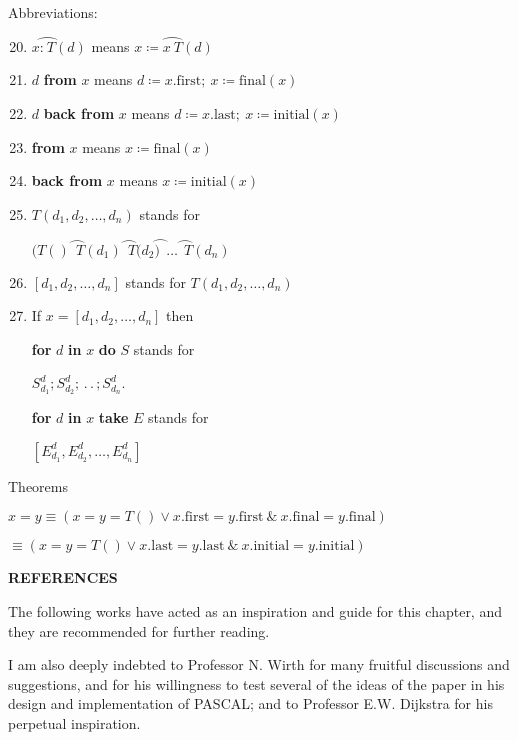 \noindent	
Abbreviations:

\begin{enumerate}[leftmargin=2\parindent, label=(\arabic*)]
	\setcounter{enumi}{19}
	\item  $x\wideparen{\text{:} \ T}(d)$ \tabto*{7em} means $x \coloneq \wideparen{x\ T}(d)$
	\item $d$ \textbf{from} $x$\tabto*{7em} means $d\coloneq x.\text{first};\ x\coloneq \text{final}(x)$
	\item $d$ \textbf{back from} $x$\tabto*{7em} means $d\coloneq x.\text{last};\ x\coloneq \text{initial}(x)$
	\item \textbf{from} $x$\tabto*{7em} means $x\coloneq \text{final}(x)$
	\item \textbf{back from} $x$\tabto*{7em} means $x\coloneq \text{initial}(x)$
	\item $T(d_1, d_2, \dots, d_n)$ stands for
	
	\quad $(T()\wideparen{\ \ T}(d_1)\wideparen{\ \ T}(d_2\wideparen{)\ \ }\dots\wideparen{\ \ T}(d_n)$
	
	\item $[d_1, d_2, \dots, d_n]$ stands for $T(d_1, d_2, \dots, d_n)$
	\item If $x = [d_1, d_2, \dots, d_n]$ then
	
	\quad \textbf{for} $d$ \textbf{in} $x$ \textbf{do} $S$ stands for

	\qquad \qquad $S_{d_1}^d; S_{d_2}^d; \,.\,.\,; S_{d_n}^d$.


	\quad \textbf{for} $d$ \textbf{in} $x$ \textbf{take} $E$ stands for
	
	\qquad \qquad $[E_{d_1}^d, E_{d_2}^d, \dots, E_{d_n}^d]$

\end{enumerate}

\noindent
Theorems

	\quad $x = y \equiv (x = y = T() \lor x.\text{first} = y.\text{first}\ \&\ x.\text{final} = y.\text{final})$

	\tabto*{4.9em} $\equiv (x = y = T() \lor x.\text{last} = y.\text{last}\ \&\ x.\text{initial} = y.\text{initial})$
	\bigskip

\noindent
\textbf{REFERENCES}
\medskip
\nopagebreak

\noindent
The following works have acted as an inspiration and guide for this chapter, and they are recommended for further reading.

I am also deeply indebted to Professor N. Wirth for many fruitful discussions and suggestions, and for his willingness to test several of the ideas of the paper in his design and implementation of PASCAL; and to Professor E.W. Dijkstra for his perpetual inspiration.
\medskip

